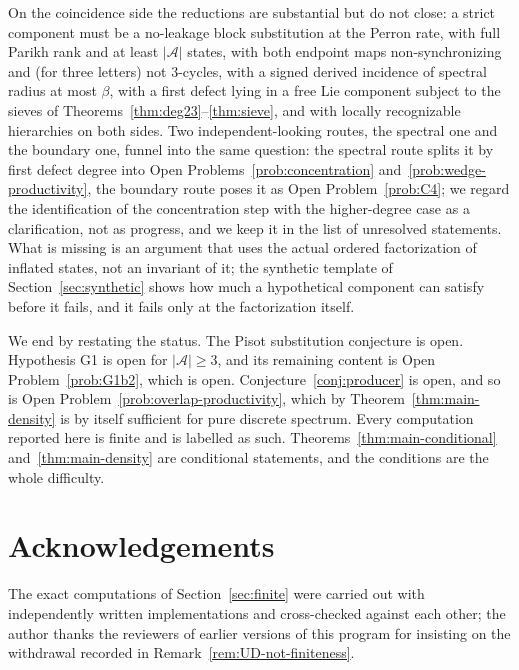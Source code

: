 \documentclass[11pt]{amsart}
\theoremstyle{plain}
\theoremstyle{definition}
\theoremstyle{remark}
\newcommand{\A}{\mathcal{A}}
\newcommand{\PDS}{pure discrete spectrum}
\begin{document}
On the coincidence side the reductions are substantial but do not close: a strict component must be a no-leakage block substitution at the Perron rate, with full Parikh rank and at least $|\A|$ states, with both endpoint maps non-synchronizing and (for three letters) not $3$-cycles, with a signed derived incidence of spectral radius at most $\beta$, with a first defect lying in a free Lie component subject to the sieves of Theorems~\ref{thm:deg23}--\ref{thm:sieve}, and with locally recognizable hierarchies on both sides. Two independent-looking routes, the spectral one and the boundary one, funnel into the same question: the spectral route splits it by first defect degree into Open Problems~\ref{prob:concentration} and~\ref{prob:wedge-productivity}, the boundary route poses it as Open Problem~\ref{prob:C4}; we regard the identification of the concentration step with the higher-degree case as a clarification, not as progress, and we keep it in the list of unresolved statements. What is missing is an argument that uses the actual ordered factorization of inflated states, not an invariant of it; the synthetic template of Section~\ref{sec:synthetic} shows how much a hypothetical component can satisfy before it fails, and it fails only at the factorization itself.

We end by restating the status. The Pisot substitution conjecture is open. Hypothesis G1 is open for $|\A|\ge3$, and its remaining content is Open Problem~\ref{prob:G1b2}, which is open. Conjecture~\ref{conj:producer} is open, and so is Open Problem~\ref{prob:overlap-productivity}, which by Theorem~\ref{thm:main-density} is by itself sufficient for \PDS{}. Every computation reported here is finite and is labelled as such. Theorems~\ref{thm:main-conditional} and~\ref{thm:main-density} are conditional statements, and the conditions are the whole difficulty.

\section*{Acknowledgements}
The exact computations of Section~\ref{sec:finite} were carried out with independently written implementations and cross-checked against each other; the author thanks the reviewers of earlier versions of this program for insisting on the withdrawal recorded in Remark~\ref{rem:UD-not-finiteness}.
\end{document}
